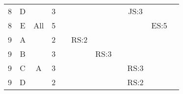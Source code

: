 \documentclass[12pt]{article}
\begin{document}
\begin{table}[H]
\begin{tabular}{@{}c|c|c|c|ccccccc@{}}
8     & D    &            & 3                                                      &                                                 &                                                 &                                                  &                                                  &    JS:3                                              &                                                  &                                                  \\ 
8     & E    & All        & 5                                                      &                                                 &                                                 &                                                  &                                                  &                                            &   ES:5                                                 &                                                  \\ 
9     & A    &            & 2                                                      &                                                 &  RS:2                                           &                                                  &                                                  &                                                  &                                                  &                                                  \\ 
9     & B    &            & 3                                                      &                                                 &                                                 & RS:3                                             &                                                  &                                                  &                                                  &                                                  \\ 
9     & C    & A          & 3                                                      &                                                 &                                                 &                                                  &                                                  &  RS:3                                                &                                                  &                                                  \\ 
9     & D    &            & 2                                                      &                                                 &                                                 &                                                  &                                                  &  RS:2                                                 &                                                  &                                                  \\ 

\end{tabular}
\end{table}
\end{document}
